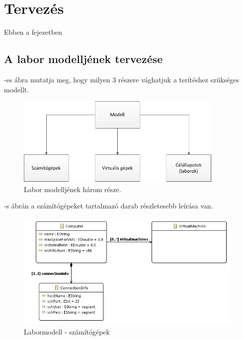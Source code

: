 \chapter{Tervezés}
\label{chp:design}
Ebben a fejezetben 



\section{A labor modelljének tervezése}
\label{design_model}

-es ábra mutatja meg, hogy milyen 3 részere vághatjuk a terítéshez szükséges modellt.

\begin{figure}[ht]
	\centering
	\includegraphics[width=100mm, keepaspectratio]{figures/design_modelparts.png}
	\caption{Labor modelljének három része.}
	\label{fig:designmodelparts}
\end{figure}

-s ábrán a számítógépeket tartalmazó darab részletesebb leírása van.

\begin{figure}[ht]
	\centering
	\includegraphics[width=110mm, keepaspectratio]{figures/design_computer.png}
	\caption{Labormodell - számítógépek}
	\label{fig:designcomputers}
\end{figure}


